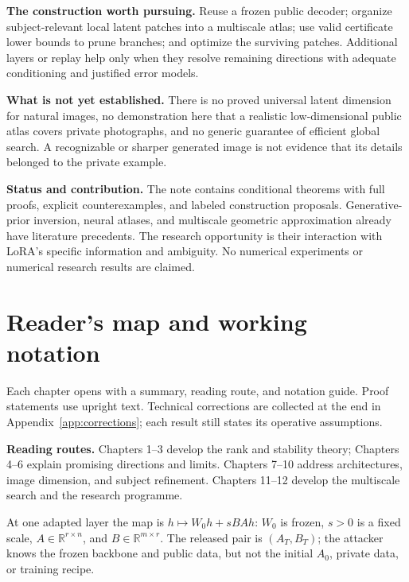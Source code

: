 \documentclass[11pt,a4paper]{article}
\theoremstyle{definition}
\theoremstyle{definition}
\theoremstyle{remark}\newtheorem{remark}[theorem]{Remark}
\newcommand{\R}{\mathbb R}\newcommand{\Prob}{\mathbb P}\newcommand{\E}{\mathbb E}
\begin{document}
\textbf{The construction worth pursuing.} Reuse a frozen public decoder; organize subject-relevant local latent patches into a multiscale atlas; use valid certificate lower bounds to prune branches; and optimize the surviving patches. Additional layers or replay help only when they resolve remaining directions with adequate conditioning and justified error models.

\textbf{What is not yet established.} There is no proved universal latent dimension for natural images, no demonstration here that a realistic low-dimensional public atlas covers private photographs, and no generic guarantee of efficient global search. A recognizable or sharper generated image is not evidence that its details belonged to the private example.

\textbf{Status and contribution.} The note contains conditional theorems with full proofs, explicit counterexamples, and labeled construction proposals. Generative-prior inversion, neural atlases, and multiscale geometric approximation already have literature precedents. The research opportunity is their interaction with LoRA's specific information and ambiguity. No numerical experiments or numerical research results are claimed.

\clearpage
\section*{Reader's map and working notation}

Each chapter opens with a summary, reading route, and notation guide. Proof statements use upright text. Technical corrections are collected at the end in Appendix~\ref{app:corrections}; each result still states its operative assumptions.

\textbf{Reading routes.} Chapters 1--3 develop the rank and stability theory; Chapters 4--6 explain promising directions and limits. Chapters 7--10 address architectures, image dimension, and subject refinement. Chapters 11--12 develop the multiscale search and the research programme.

At one adapted layer the map is $h\mapsto W_0h+sBAh$: $W_0$ is frozen, $s>0$ is a fixed scale, $A\in\R^{r\times n}$, and $B\in\R^{m\times r}$. The released pair is $(A_T,B_T)$; the attacker knows the frozen backbone and public data, but not the initial $A_0$, private data, or training recipe.
\end{document}
